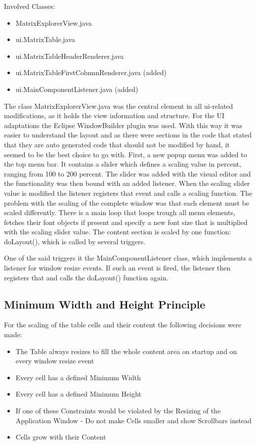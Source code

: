 Involved Classes:
\begin{itemize}
	\item MatrixExplorerView.java
	\item ui.MatrixTable.java
	\item ui.MatrixTableHeaderRenderer.java
	\item ui.MatrixTableFirstColumnRenderer.java (added)
	\item ui.MainComponentListener.java (added)
\end{itemize}

The class MatrixExplorerView.java was the central element in all ui-related modifications, as it holds the view information and structure. For the UI adaptations the Eclipse WindowBuilder plugin was used. With this way it was easier to understand the layout and as there were sections in the code that stated that they are auto generated code that should not be modified by hand, it seemed to be the best choice to go with. First, a new popup menu was added to the top menu bar. It contains a slider which defines a scaling value in percent, ranging from 100 to 200 percent. The slider was added with the visual editor and the functionality was then bound with an added listener. When the scaling slider value is modified the listener registers that event and calls a scaling function. The problem with the scaling of the complete window was that each element must be scaled differently. There is a main loop that loops trough all menu elements, fetches their font objects if present and specify a new font size that is multiplied with the scaling slider value. The content section is scaled by one function: doLayout(), which is called by several triggers.

One of the said triggers it the MainComponentListener class, which implements a listener for window resize events. If such an event is fired, the listener then registers that and calls the doLayout() function again.


\subsection{Minimum Width and Height Principle}

For the scaling of the table cells and their content the following decisions were made:
\begin{itemize}
	\item The Table always resizes to fill the whole content area on startup and on every window resize event
	\item Every cell has a defined Minimum Width
	\item Every cell has a defined Minimum Height
	\item If one of these Constraints would be violated by the Resizing of the Application Window - Do not make Cells smaller and show Scrollbars instead
	\item Cells grow with their Content
\end{itemize}


